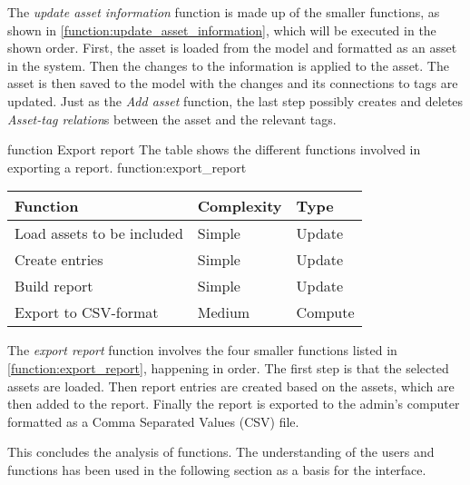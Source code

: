 The \textit{update asset information} function is made up of the smaller functions, as shown in \autoref{function:update_asset_information}, which will be executed in the shown order. First, the asset is loaded from the model and formatted as an asset in the system. Then the changes to the information is applied to the asset. The asset is then saved to the model with the changes and its connections to tags are updated. Just as the \textit{Add asset} function, the last step possibly creates and deletes \textit{Asset-tag relation}s between the asset and the relevant tags.

\fancyLayout
    {function}
    {Export report}
    {The table shows the different functions involved in exporting a report.}
    {function:export_report}
    {
        \centering
        \begin{tabular}{|l|l|l|}
            \hline
            \textbf{Function} & \textbf{Complexity} & \textbf{Type}\\
            \hline
            \hline
            Load assets to be included & Simple & Update \\
            \hline
            Create entries & Simple & Update \\
            \hline
            Build report & Simple & Update \\
            \hline
            Export to CSV-format & Medium & Compute \\
            \hline
        \end{tabular}
}

The \textit{export report} function involves the four smaller functions listed in \autoref{function:export_report}, happening in order. The first step is that the selected assets are loaded. Then report entries are created based on the assets, which are then added to the report. Finally the report is exported to the admin's computer formatted as a Comma Separated Values (CSV) file.
\par
This concludes the analysis of functions. The understanding of the users and functions has been used in the following section as a basis for the interface.